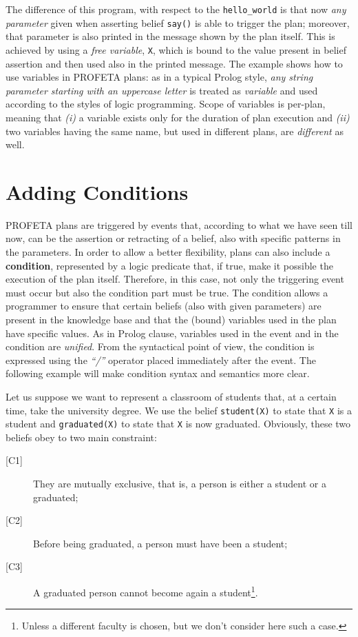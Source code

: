The difference of this program, with respect to the \texttt{hello\_world}
is that now \emph{any parameter} given when asserting belief \texttt{say()}
is able to trigger the plan; moreover, that parameter is also printed in the
message shown by the plan itself.
This is achieved by using a \emph{free variable}, \texttt{X}, which is
bound to the value present in belief assertion and then used also in the
printed message.
The example shows how to use variables in PROFETA plans: as in a typical
Prolog style, \emph{any string parameter starting with an uppercase letter}
is treated as \emph{variable} and used according to the styles of logic
programming.
Scope of variables is per-plan, meaning that \emph{(i)} a variable exists
only for the
duration of plan execution and  \emph{(ii)}  two variables having the same
name, but used in different plans, are \emph{different} as well.


\section{Adding Conditions}
PROFETA plans are triggered by events that, according to what we have seen
till now, can be the assertion or retracting of a belief, also with specific
patterns in the parameters.
In order to allow a better flexibility, plans can also include a
\textbf{condition}, represented by a logic predicate that, if true, make it
possible the execution of the plan itself.
Therefore, in this case, not only the triggering event must
occur but also the condition part must be true.
The condition allows a programmer to ensure that certain
beliefs  (also with given parameters) are present in the knowledge base and
that the (bound) variables used in the plan have specific values.
As in Prolog clause, variables used in the event and in the condition are
\emph{unified}.
From the syntactical point of view, the condition is expressed using the
\emph{``/''} operator placed immediately after the event.
The following example will make condition syntax and semantics more clear.

Let us suppose we want to represent a classroom of students that, at a
certain time, take the university degree.
We use the belief \texttt{student(X)} to state that \texttt{X} is a student
and  \texttt{graduated(X)} to state that \texttt{X} is now graduated.
Obviously, these two beliefs obey to two main constraint:
\begin{description}
\item[{[C1]}] They are mutually exclusive, that is, a person is either a student or
  a graduated;
\item[{[C2]}] Before being graduated, a person must have been a student;
\item[{[C3]}] A graduated person cannot become again a student\footnote{Unless a
  different faculty is chosen, but we don't consider here such a case.}.
\end{description}


